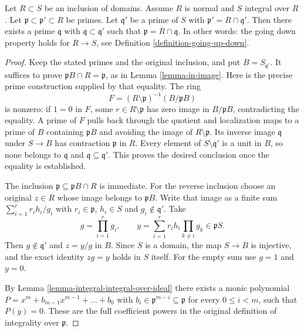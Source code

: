 \begin{proposition}
\label{proposition-going-down-normal-integral}
Let $R \subset S$ be an inclusion of domains.
Assume $R$ is normal and $S$ integral over $R$.
Let $\mathfrak p \subset \mathfrak p' \subset R$
be primes. Let $\mathfrak q'$ be a prime of $S$
with $\mathfrak p' = R \cap \mathfrak q'$.
Then there exists a prime $\mathfrak q$
with $\mathfrak q \subset \mathfrak q'$
such that $\mathfrak p = R \cap \mathfrak q$. In other words:
the going down property holds for $R \to S$, see
Definition \ref{definition-going-up-down}.
\end{proposition}

\begin{proof}
Keep the stated primes and the original inclusion, and put
$B=S_{\mathfrak q'}$. It suffices to prove
$\mathfrak pB\cap R=\mathfrak p$, as in Lemma \ref{lemma-in-image}.
Here is the precise prime construction supplied by that equality.
The ring
$$
F=(R\setminus\mathfrak p)^{-1}(B/\mathfrak pB)
$$
is nonzero: if $1=0$ in $F$, some $r\in R\setminus\mathfrak p$
has zero image in $B/\mathfrak pB$, contradicting the equality.
A prime of $F$ pulls back through the quotient and localization
maps to a prime of $B$ containing $\mathfrak pB$ and avoiding
the image of $R\setminus\mathfrak p$. Its inverse image
$\mathfrak q$ under $S\to B$ has contraction $\mathfrak p$
in $R$. Every element of $S\setminus\mathfrak q'$ is a unit
in $B$, so none belongs to $\mathfrak q$ and
$\mathfrak q\subseteq\mathfrak q'$. This proves the desired
conclusion once the equality is established.

The inclusion $\mathfrak p\subseteq\mathfrak pB\cap R$ is
immediate. For the reverse inclusion choose an original
$z\in R$ whose image belongs to $\mathfrak pB$. Write that
image as a finite sum $\sum_{i=1}^r r_i h_i/g_i$ with
$r_i\in\mathfrak p$, $h_i\in S$ and $g_i\notin\mathfrak q'$.
Take
$$
g=\prod_{i=1}^r g_i,\qquad
y=\sum_{i=1}^r r_i h_i\prod_{k\ne i}g_k\in\mathfrak pS.
$$
Then $g\notin\mathfrak q'$ and $z=y/g$ in $B$. Since $S$
is a domain, the map $S\to B$ is injective, and the exact
identity $zg=y$ holds in $S$ itself. For the empty sum use
$g=1$ and $y=0$.

\medskip\noindent
By Lemma \ref{lemma-integral-integral-over-ideal}
there exists a monic polynomial
$P = x^m + b_{m-1} x^{m-1} + \ldots + b_0$
with $b_i\in\mathfrak p^{m-i}\subseteq\mathfrak p$
for every $0\leq i<m$, such that $P(y)=0$.
These are the full coefficient powers in the original definition
of integrality over $\mathfrak p$.


\end{proof}
